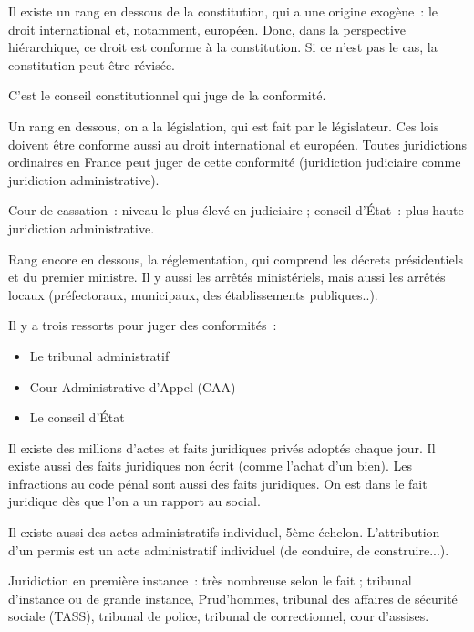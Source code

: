﻿\documentclass[12pt, a4paper, openany]{book}
\begin{document}
Il existe un rang en dessous de la constitution, qui a une origine exogène~: le droit international et, notamment, européen. Donc, dans la perspective hiérarchique, ce droit est conforme à la constitution. Si ce n'est pas le cas, la constitution peut être révisée.

C'est le conseil constitutionnel qui juge de la conformité.\newline

Un rang en dessous, on a la législation, qui est fait par le législateur. Ces lois doivent être conforme aussi au droit international et européen. Toutes juridictions ordinaires en France peut juger de cette conformité (juridiction judiciaire comme juridiction administrative).\newline

Cour de cassation~: niveau le plus élevé en judiciaire ; conseil d'État~: plus haute juridiction administrative. 

Rang encore en dessous, la réglementation, qui comprend les décrets présidentiels et du premier ministre. Il y aussi les arrêtés ministériels, mais aussi les arrêtés locaux (préfectoraux, municipaux, des établissements publiques..).\newline

Il y a trois ressorts pour juger des conformités~:
\begin{itemize}
\item Le tribunal administratif
\item Cour Administrative d'Appel (CAA)
\item Le conseil d'État
\end{itemize}

Il existe des millions d'actes et faits juridiques privés adoptés chaque jour. Il existe aussi des faits juridiques non écrit (comme l'achat d'un bien). Les infractions au code pénal sont aussi des faits juridiques. On est dans le fait juridique dès que l'on a un rapport au social. \newline

Il existe aussi des actes administratifs individuel, 5ème échelon. L'attribution d'un permis est un acte administratif individuel (de conduire, de construire...). \newline

Juridiction en première instance~: très nombreuse selon le fait ; tribunal d'instance ou de grande instance, Prud'hommes, tribunal des affaires de sécurité sociale (TASS), tribunal de police, tribunal de correctionnel, cour d'assises.
\end{document}
